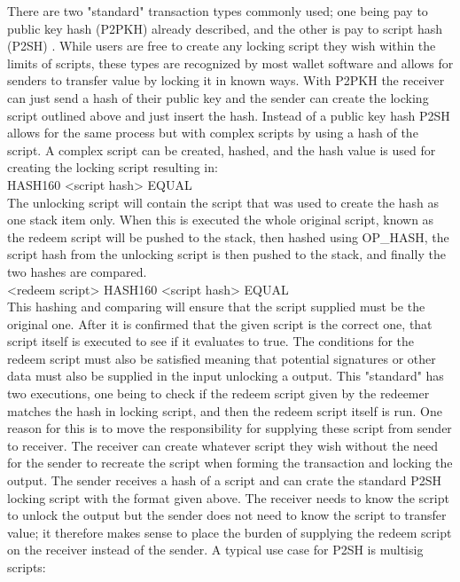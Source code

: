 There are two "standard" transaction types commonly used; one being pay to public key hash (P2PKH) already described, and the other is pay to script hash (P2SH) \cite{BIP16}. While users are free to create any locking script they wish within the limits of scripts, these types are recognized by most wallet software and allows for senders to transfer value by locking it in known ways. With P2PKH the receiver can just send a hash of their public key and the sender can create the locking script outlined above and just insert the hash. Instead of a public key hash P2SH allows for the same process but with complex scripts by using a hash of the script. A complex script can be created, hashed, and the hash value is used for creating the locking script resulting in:
\\

HASH160 <script hash> EQUAL
\\

The unlocking script will contain the script that was used to create the hash as one stack item only. When this is executed the whole original script, known as the redeem script will be pushed to the stack, then hashed using OP\_HASH, the script hash from the unlocking script is then pushed to the stack, and finally the two hashes are compared.
\\

<redeem script> HASH160 <script hash> EQUAL
\\

This hashing and comparing will ensure that the script supplied must be the original one. After it is confirmed that the given script is the correct one, that script itself is executed to see if it evaluates to true. The conditions for the redeem script must also be satisfied meaning that potential signatures or other data must also be supplied in the input unlocking a output. This "standard" has two executions, one being to check if the redeem script given by the redeemer matches the hash in locking script, and then the redeem script itself is run.
One reason for this is to move the responsibility for supplying these script from sender to receiver. The receiver can create whatever script they wish without the need for the sender to recreate the script when forming the transaction and locking the output. The sender receives a hash of a script and can crate the standard P2SH locking script with the format given above. The receiver needs to know the script to unlock the output but the sender does not need to know the script to transfer value; it therefore makes sense to place the burden of supplying the redeem script on the receiver instead of the sender. A typical use case for P2SH is multisig scripts: 
\\


